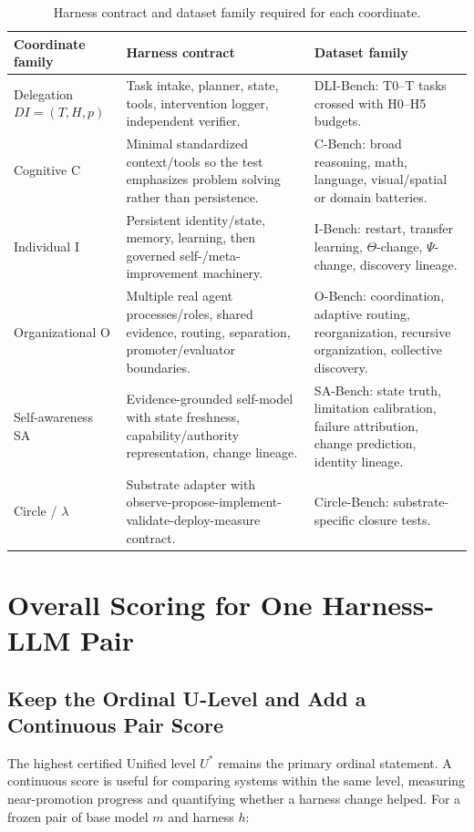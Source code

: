 \begin{table}[!htbp]
\centering\small
\begin{tabularx}{\textwidth}{@{}lYY@{}}
\toprule
Coordinate family & Harness contract & Dataset family \\
\midrule
Delegation $DI=(T,H,p)$ & Task intake, planner, state, tools, intervention logger, independent verifier. & DLI-Bench: T0--T\Om{} tasks crossed with H0--H5 budgets. \\
Cognitive C & Minimal standardized context/tools so the test emphasizes problem solving rather than persistence. & C-Bench: broad reasoning, math, language, visual/spatial or domain batteries. \\
Individual I & Persistent identity/state, memory, learning, then governed self-/meta-improvement machinery. & I-Bench: restart, transfer learning, $\Theta$-change, $\Psi$-change, discovery lineage. \\
Organizational O & Multiple real agent processes/roles, shared evidence, routing, separation, promoter/evaluator boundaries. & O-Bench: coordination, adaptive routing, reorganization, recursive organization, collective discovery. \\
Self-awareness SA & Evidence-grounded self-model with state freshness, capability/authority representation, change lineage. & SA-Bench: state truth, limitation calibration, failure attribution, change prediction, identity lineage. \\
Circle / $\lambda$ & Substrate adapter with observe-propose-implement-validate-deploy-measure contract. & Circle-Bench: substrate-specific closure tests. \\
\bottomrule
\end{tabularx}
\caption{Harness contract and dataset family required for each coordinate.}
\label{tab:contracts}
\end{table}

\section{Overall Scoring for One Harness-LLM Pair}\label{sec:hlis}

\subsection{Keep the Ordinal U-Level and Add a Continuous Pair Score}

The highest certified Unified level $U^{*}$ remains the primary ordinal statement. A continuous score is useful for comparing systems within the same level, measuring near-promotion progress and quantifying whether a harness change helped. For a frozen pair of base model $m$ and harness $h$:

